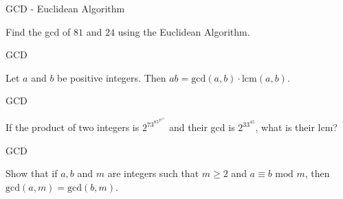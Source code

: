 \documentclass{beamer}
\renewcommand{\mod}{\text{ mod }}
\begin{document}
\begin{frame}[t]{GCD - Euclidean Algorithm}
    \begin{example}
        Find the gcd of $81$ and $24$ using the Euclidean Algorithm. 
    \end{example}
\end{frame}

\begin{frame}[t]{GCD}
    \begin{theorem}
        Let $a$ and $b$ be positive integers. Then $ab = \text{gcd}(a,b) \cdot \text{lcm}(a,b)$.
    \end{theorem}
\end{frame}

\begin{frame}[t]{GCD}
    \begin{example}
        If the product of two integers is $2^73^85^27^{11}$ and their gcd is $2^33^45$, what is their lcm?
    \end{example}
\end{frame}

\begin{frame}[t]{GCD}
    \begin{example}
        Show that if $a,b$ and $m$ are integers such that $m \geq 2$ and $a \equiv b \mod m$, then $\text{gcd}(a,m) = \text{gcd}(b,m)$.
    \end{example}
\end{frame}
\end{document}
